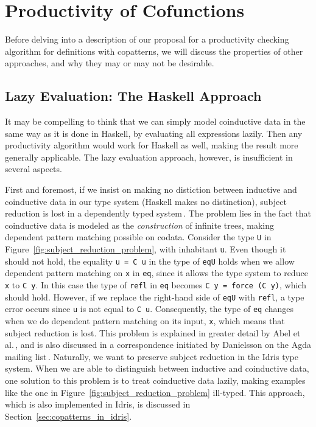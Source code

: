 \section{Productivity of Cofunctions}
\label{sec:productivity}

Before delving into a description of our proposal for a productivity checking algorithm for definitions with copatterns, we will discuss the properties of other approaches, and why they may or may not be desirable.

\subsection{Lazy Evaluation: The Haskell Approach}
It may be compelling to think that we can simply model coinductive data in the same way as it is done in Haskell, by evaluating all expressions lazily. Then any productivity algorithm would work for Haskell as well, making the result more generally applicable. The lazy evaluation approach, however, is insufficient in several aspects.

First and foremost, if we insist on making no distiction between inductive and coinductive data in our type system (Haskell makes no distinction), subject reduction is lost in a dependently typed system\,\citep{Abel13Copatterns}. The problem lies in the fact that coinductive data is modeled as the \emph{construction} of infinite trees, making dependent pattern matching possible on codata. Consider the type \texttt{U} in Figure~\ref{fig:subject_reduction_problem}, with inhabitant \texttt{u}. Even though it should not hold, the equality \texttt{u = C u} in the type of \texttt{eqU} holds when we allow dependent pattern matching on \texttt{x} in \texttt{eq}, since it allows the type system to reduce \texttt{x} to \texttt{C y}. In this case the type of \texttt{refl} in \texttt{eq} becomes \texttt{C y = force (C y)}, which should hold. However, if we replace the right-hand side of \texttt{eqU} with \texttt{refl}, a type error occurs since \texttt{u} is not equal to \texttt{C u}. Consequently, the type of \texttt{eq} changes when we do dependent pattern matching on its input, \texttt{x}, which means that subject reduction is lost. This problem is explained in greater detail by Abel et al.\,\citep{Abel13Copatterns}, and is also discussed in a correspondence initiated by Danielsson on the Agda mailing list\,\citep{OuryCounterexample}. Naturally, we want to preserve subject reduction in the Idris type system. When we are able to distinguish between inductive and coinductive data, one solution to this problem is to treat coinductive data lazily, making examples like the one in Figure~\ref{fig:subject_reduction_problem} ill-typed. This approach, which is also implemented in Idris, is discussed in Section~\ref{sec:copatterns_in_idris}.

